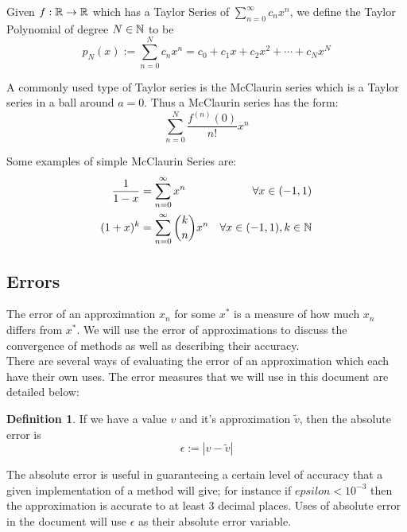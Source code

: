 \begin{Taylor Polynomial}
\label{DEF_"Taylor Polynomial"}
Given \(f : \mathbb{R} \to \mathbb{R}\) which has a Taylor Series of
\( \sum_{n=0}^\infty c_n x^n \), we define the Taylor Polynomial of degree \(N \in \mathbb{N}\) to be
\[ p_N(x) := \sum_{n=0}^N c_n x^n = c_0 + c_1 x + c_2 x^2 + \dotsb + c_N x^N\]
\end{Taylor Polynomial}

A commonly used type of Taylor series is the McClaurin series which is a Taylor series in a ball around \(a = 0\). Thus a McClaurin series has the form:
\[\sum_{n=0}^N \frac{f^{(n)}(0)}{n!}x^n\]

Some examples of simple McClaurin Series are:
\begin{align*}
\frac{1}{1-x} &= \sum_{n=0}^\infty x^n &\forall x \in {({-1},1)}\\
(1 + x)^k	  &= \sum_{n=0}^\infty \binom{k}{n} x^n 
					&\forall x \in (-1,1), k \in \mathbb{N}
\end{align*}

\subsection{Errors}
\label{SUB_"Error Definitions"}
\theoremstyle{definition}
\newtheorem{Absolute Error}{Definition}[subsection]
\newtheorem{Iteration Error}[Absolute Error]{Definition}

The error of an approximation \(x_n\) for some \(x^\ast\) is a measure of how much \(x_n\) differs from \(x^\ast\). We will use the error of approximations to discuss the convergence of methods as well as describing their accuracy.\\

There are several ways of evaluating the error of an approximation which each have their own uses. The error measures that we will use in this document are detailed below:

\begin{Absolute Error}
\label{DEF_"Absolute Error"}
If we have a value \(v\) and it's approximation \(\tilde{v}\), then the absolute error is
\[ \epsilon := \left| v - \tilde{v} \right| \]
\end{Absolute Error}

The absolute error is useful in guaranteeing a certain level of accuracy that a given implementation of a method will give; for instance if \(epsilon < 10^{-3}\) then the approximation is accurate to at least 3 decimal places. Uses of absolute error in the document will use \(\epsilon\) as their absolute error variable.

